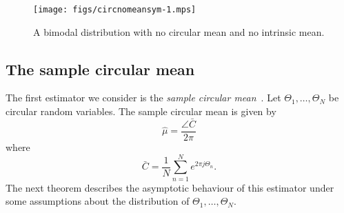 \documentclass[journal]{../bib/IEEEtran}
\begin{document}
\begin{figure}[tp]
	\centering
		\texttt{[image: figs/circnomeansym-1.mps]}
		\caption{A bimodal distribution with no circular mean and no intrinsic mean.}
		\label{fig:circnomeanbimodal}
\end{figure}


\subsection{The sample circular mean}\label{sec:sample-circular-mean}

The first estimator we consider is the \emph{sample circular mean}~\cite[p.~15]{Mardia_directional_statistics}\cite{Fisher1993,Jammalamadaka_dir_stat_book}.  Let $\Theta_1, \dots, \Theta_N$ be circular random variables. The sample circular mean is given by
\[
\hat{\mu} = \frac{\angle{\bar{C}}}{2\pi}
\]
where
\[
\bar{C} = \frac{1}{N}\sum_{n=1}^{N}e^{2\pi j \Theta_n}. 
\]  
The next theorem describes the asymptotic behaviour of this estimator under some assumptions about the distribution of $\Theta_1, \dots, \Theta_N$.


\end{document}
